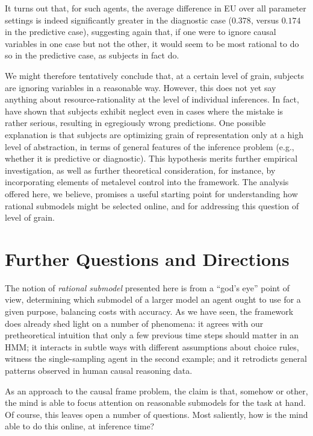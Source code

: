 \documentclass[10pt,letterpaper]{article}
\begin{document}
It turns out that, for such agents, the average difference in EU over all parameter settings is indeed significantly greater in the diagnostic case ($0.378$, versus $0.174$ in the predictive case), suggesting again that, if one were to ignore causal variables in one case but not the other, it would seem to be most rational to do so in the predictive case, as subjects in fact do. 

We might therefore tentatively conclude that, at a certain level of grain, subjects are ignoring variables in a reasonable way. However, this does not yet say anything about resource-rationality at the level of individual inferences. In fact, \cite{Fernbach2013} have shown that subjects exhibit neglect even in cases where the mistake is rather serious, resulting in egregiously wrong predictions. One possible explanation is that subjects are optimizing grain of representation only at a high level of abstraction, in terms of general features of the inference problem (e.g., whether it is predictive or diagnostic). This hypothesis merits further empirical investigation, as well as further theoretical consideration, for instance, by incorporating elements of metalevel control \citep{Icard2014,Lieder2014} into the framework. The analysis offered here, we believe, promises a useful starting point for understanding how rational submodels might be selected online, and for addressing this question of level of grain.

\section{Further Questions and Directions}

The notion of \emph{rational submodel} presented here is from a ``god's eye'' point of view, determining which submodel of a larger model an agent ought to use for a given purpose, balancing costs with accuracy. As we have seen, the framework does already shed light on a number of phenomena: it agrees with our pretheoretical intuition that only a few previous time steps should matter in an HMM; it interacts in subtle ways with different assumptions about choice rules, witness the single-sampling agent in the second example; and it retrodicts general patterns observed in human causal reasoning data.

As an approach to the causal frame problem, the claim is that, somehow or other, the mind is able to focus attention on reasonable submodels for the task at hand. Of course, this leaves open a number of questions. Most saliently, how is the mind able to do this online, at inference time?
\end{document}
